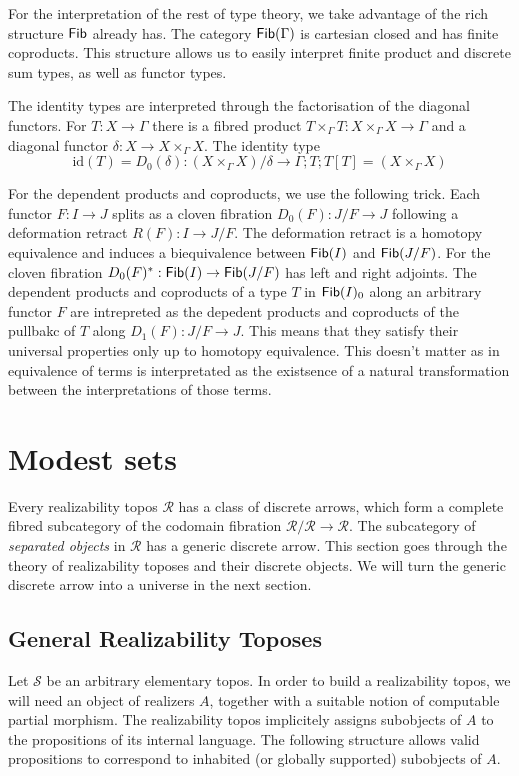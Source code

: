 \documentclass{amsart}
\theoremstyle{plain}
\theoremstyle{definition}
\newcommand\cat\mathcal
\newcommand\id{\mathrm{id}}
\begin{document}
For the interpretation of the rest of type theory, we take advantage of the rich structure $\mathsf{Fib}$ already has. The category $\mathsf{Fib}(\Gamma)$ is cartesian closed and has finite coproducts. This structure allows us to easily interpret finite product and discrete sum types, as well as functor types.

The identity types are interpreted through the factorisation of the diagonal functors. For $T:X\to \Gamma$ there is a fibred product $T\times_\Gamma T:X\times_\Gamma X \to \Gamma$ and a diagonal functor $\delta: X\to X\times_\Gamma X$. The identity type 
\[ \id(T) = D_0(\delta):(X\times_\Gamma X)/\delta\to \Gamma;T;T[T] = (X\times_\Gamma X) \]

For the dependent products and coproducts, we use the following trick. Each functor $F:I \to J$ splits as a cloven fibration $D_0(F):J/F\to J$ following a deformation retract $R(F):I\to J/F$. The deformation retract is a homotopy equivalence and induces a biequivalence between $\mathsf{Fib}(I)$ and $\mathsf{Fib}(J/F)$. For the cloven fibration $D_0(F)^*:\mathsf{Fib}(I) \to \mathsf{Fib}(J/F)$ has left and right adjoints. The dependent products and coproducts of a type $T$ in $\mathsf{Fib}(I)_0$ along an arbitrary functor $F$ are intrepreted as the depedent products and coproducts of the pullbakc of $T$ along $D_1(F):J/F\to J$. This means that they satisfy their universal properties only up to homotopy equivalence. This doesn't matter as in equivalence of terms is interpretated as the existsence of a natural transformation between the interpretations of those terms.

\section{Modest sets}%
Every realizability topos $\cat R$ has a class of discrete arrows, which form a complete fibred subcategory of the codomain fibration $\cat R/\cat R \to\cat R$. The subcategory of \emph{separated objects} in $\cat R$ has a generic discrete arrow. This section goes through the theory of realizability toposes and their discrete objects. We will turn the generic discrete arrow into a universe in the next section.

\subsection{General Realizability Toposes}
Let $\cat S$ be an arbitrary elementary topos. In order to build a realizability topos, we will need an object of realizers $A$, together with a suitable notion of computable partial morphism. The realizability topos implicitely assigns subobjects of $A$ to the propositions of its internal language. The following structure allows valid propositions to correspond to inhabited (or globally supported) subobjects of $A$.
\end{document}
